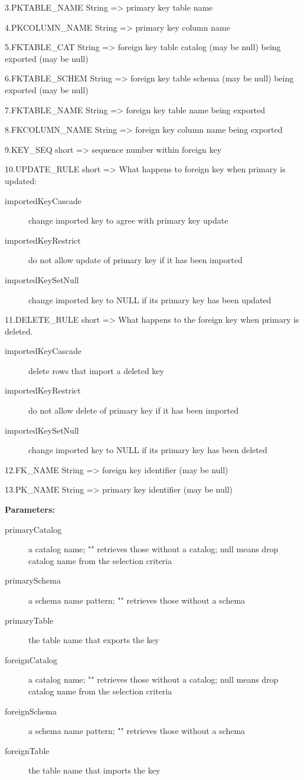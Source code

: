 3.PKTABLE\_NAME String => primary key table name 

4.PKCOLUMN\_NAME String => primary key column name 

5.FKTABLE\_CAT String => foreign key table catalog (may be null) being exported (may be null) 

6.FKTABLE\_SCHEM String => foreign key table schema (may be null) being exported (may be null) 

7.FKTABLE\_NAME String => foreign key table name being exported 

8.FKCOLUMN\_NAME String => foreign key column name being exported 

9.KEY\_SEQ short => sequence number within foreign key 

10.UPDATE\_RULE short => What happens to foreign key when primary is updated: 
\begin{description}
\item[importedKeyCascade] change imported key to agree with primary key update 
\item[importedKeyRestrict] do not allow update of primary key if it has been imported 
\item[importedKeySetNull] change imported key to NULL if its primary key has been updated 
\end{description}

11.DELETE\_RULE short => What happens to the foreign key when primary is deleted. 
\begin{description}
\item[importedKeyCascade] delete rows that import a deleted key 
\item[importedKeyRestrict] do not allow delete of primary key if it has been imported 
\item[importedKeySetNull] change imported key to NULL if its primary key has been deleted 
\end{description}

12.FK\_NAME String => foreign key identifier (may be null) 

13.PK\_NAME String => primary key identifier (may be null) 


{\bf Parameters: }
\begin{description}
\item[primaryCatalog] a catalog name; "" retrieves those without a catalog; null means drop catalog name from the selection criteria 
\item[primarySchema] a schema name pattern; "" retrieves those without a schema 
\item[primaryTable] the table name that exports the key 
\item[foreignCatalog] a catalog name; "" retrieves those without a catalog; null means drop catalog name from the selection criteria 
\item[foreignSchema] a schema name pattern; "" retrieves those without a schema 
\item[foreignTable] the table name that imports the key 
\end{description}


